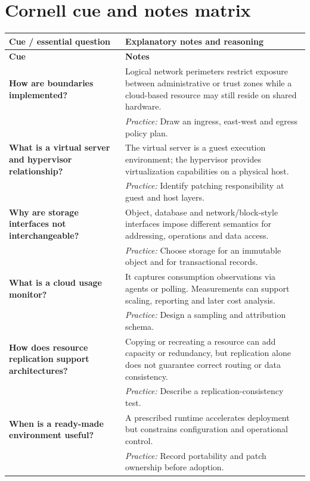 \documentclass[10pt,letterpaper]{article}
\begin{document}
\section{Cornell cue and notes matrix}
\small\setlength{\LTleft}{0pt}\setlength{\LTright}{0pt plus 1fill}
\begin{longtable}{>{\RaggedRight\arraybackslash}p{}>{\RaggedRight\arraybackslash}p{}}
\toprule\textbf{Cue / essential question}&\textbf{Explanatory notes and reasoning}\\\midrule\endfirsthead\toprule\textbf{Cue}&\textbf{Notes}\\\midrule\endhead
\textbf{How are boundaries implemented?} & Logical network perimeters restrict exposure between administrative or trust zones while a cloud-based resource may still reside on shared hardware.\\[3pt]& \textcolor{petrol}{\emph{Practice:} Draw an ingress, east-west and egress policy plan.}\\[8pt]\midrule
\textbf{What is a virtual server and hypervisor relationship?} & The virtual server is a guest execution environment; the hypervisor provides virtualization capabilities on a physical host.\\[3pt]& \textcolor{petrol}{\emph{Practice:} Identify patching responsibility at guest and host layers.}\\[8pt]\midrule
\textbf{Why are storage interfaces not interchangeable?} & Object, database and network/block-style interfaces impose different semantics for addressing, operations and data access.\\[3pt]& \textcolor{petrol}{\emph{Practice:} Choose storage for an immutable object and for transactional records.}\\[8pt]\midrule
\textbf{What is a cloud usage monitor?} & It captures consumption observations via agents or polling. Measurements can support scaling, reporting and later cost analysis.\\[3pt]& \textcolor{petrol}{\emph{Practice:} Design a sampling and attribution schema.}\\[8pt]\midrule
\textbf{How does resource replication support architectures?} & Copying or recreating a resource can add capacity or redundancy, but replication alone does not guarantee correct routing or data consistency.\\[3pt]& \textcolor{petrol}{\emph{Practice:} Describe a replication-consistency test.}\\[8pt]\midrule
\textbf{When is a ready-made environment useful?} & A prescribed runtime accelerates deployment but constrains configuration and operational control.\\[3pt]& \textcolor{petrol}{\emph{Practice:} Record portability and patch ownership before adoption.}\\[8pt]\midrule
\end{longtable}\normalsize
\end{document}
